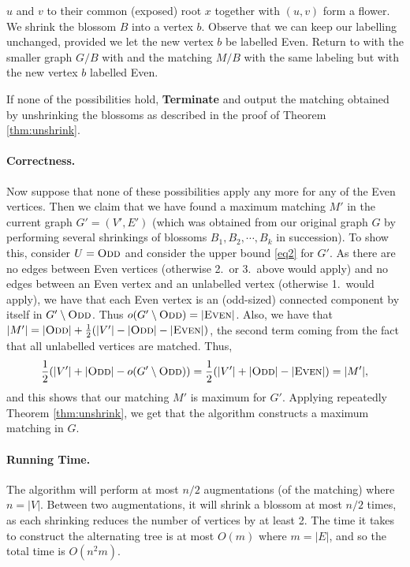 \documentclass[12pt]{article}
\begin{document}
\begin{itemize}
\begin{enumerate}
$u$ and $v$ to their common (exposed) root $x$ together with $(u,v)$
form a flower. We shrink the blossom $B$ into a vertex $b$. Observe that we can keep our
labelling unchanged, provided we let the new vertex $b$ be labelled
{\sc Even}. Return to  with the smaller graph $G/B$ with and the matching $M/B$ with the same labeling but with the new vertex $b$ labelled {\sc Even}.
\end{enumerate}
If none of the possibilities hold, \textbf{Terminate} and output the matching obtained by unshrinking the blossoms as described in the proof of Theorem \ref{thm:unshrink}.
\end{itemize}

\paragraph{Correctness.} Now suppose that none of these possibilities
apply any more for any of the {\sc Even} vertices. Then we claim that we
have found a maximum matching $M'$ in the current graph $G'=(V',E')$
(which was obtained from our original graph $G$ by performing several
shrinkings of blossoms $B_1, B_2, \cdots, B_k$ in
succession). To show this, consider $U=\textsc{Odd}$ and consider the upper
bound \ref{eq2} for $G'$. As there are no edges between {\sc Even}
vertices (otherwise 2.~or 3.~above would apply) and no edges between
an {\sc Even} vertex and an unlabelled vertex (otherwise 1.~would apply),
we have that each {\sc Even} vertex is an (odd-sized) connected component by
itself in $G'\setminus \textsc{Odd}$. Thus $o(G'\setminus \textsc{Odd})=|\textsc{Even}|$. Also,
we have that $|M'|=|\textsc{Odd}| + \frac{1}{2} (|V'|-|\textsc{Odd}|-|\textsc{Even}|)$, the
second term coming from the fact that all unlabelled vertices are
matched. Thus, $$\frac{1}{2}(|V'|+|\textsc{Odd}|-o(G'\setminus
\textsc{Odd}))=\frac{1}{2}(|V'|+|\textsc{Odd}|-|\textsc{Even}|)=|M'|,$$ and this shows that our
matching $M'$ is maximum for $G'$. Applying repeatedly Theorem
\ref{thm:unshrink}, we get that the algorithm constructs a maximum
matching in $G$.

\paragraph{Running Time.} The algorithm will perform at most $n/2$
augmentations (of the matching) where $n=|V|$. Between two
augmentations, it will shrink a blossom at most $n/2$ times, as each
shrinking reduces the number of vertices by at least 2. The time it
takes to construct the alternating tree is at most $O(m)$ where
$m=|E|$, and so the total time is $O(n^2m)$. 
\end{document}
